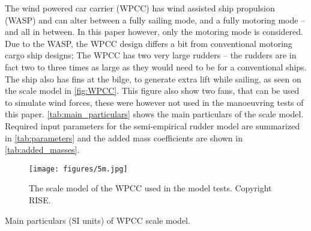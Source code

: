 The wind powered car carrier (WPCC) has wind assisted ship propulsion (WASP) and can alter between a fully sailing mode, and a fully motoring mode -- and all in between. 
In this paper however, only the motoring mode is considered. Due to the WASP, the WPCC design differs a bit from conventional motoring cargo ship designs; The WPCC has two very large rudders -- the rudders are in fact two to three times as large as they would need to be for a conventional ships. The ship also has fins at the bilge, to generate extra lift while sailing, as seen on the scale model in \autoref{fig:WPCC}. This figure also show two fans, that can be used to simulate wind forces, these were however not used in the manoeuvring tests of this paper. \autoref{tab:main_particulars} shows the main particulars of the scale model. Required input parameters for the semi-empirical rudder model are summarized in \autoref{tab:parameters} and the added mass coefficients are shown in \autoref{tab:added_masses}.
\begin{figure}[h]
    \centering
    \texttt{[image: figures/5m.jpg]}
    \caption{The scale model of the WPCC used in the model tests. Copyright RISE.}
    \label{fig:WPCC}
\end{figure}
\begin{table}[h]
    \centering
    \caption{Main particulars (SI units) of WPCC scale model.}
    \label{tab:main_particulars}
\end{table}